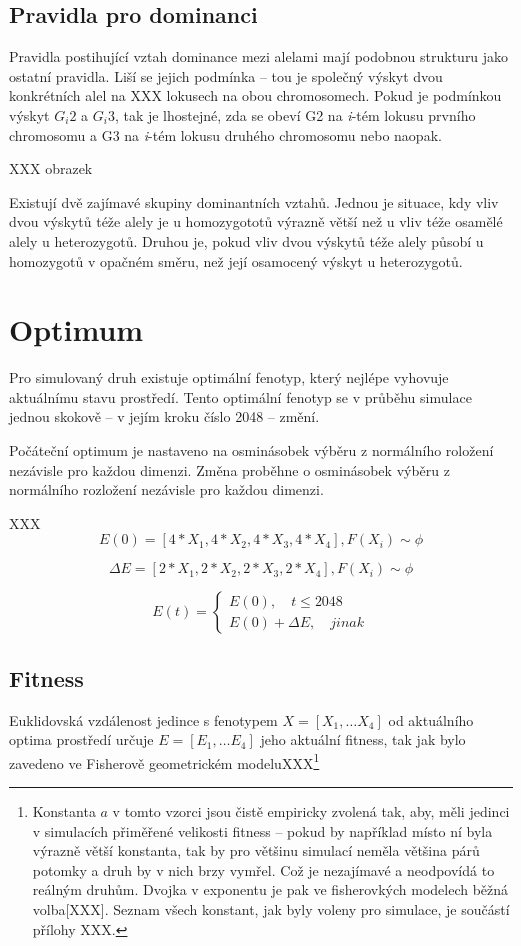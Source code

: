 \subsection{Pravidla pro dominanci}

Pravidla postihující vztah dominance mezi alelami mají podobnou strukturu jako ostatní pravidla. Liší se jejich podmínka -- tou je společný výskyt dvou konkrétních alel na XXX lokusech na obou chromosomech. Pokud je podmínkou výskyt $G_i{2}$ a $G_i{3}$, tak je lhostejné, zda se obeví G2 na \textit{i}-tém lokusu prvního chromosomu a G3 na \textit{i}-tém lokusu druhého chromosomu nebo naopak.

XXX obrazek

Existují dvě zajímavé skupiny dominantních vztahů. Jednou je situace, kdy vliv dvou výskytů téže alely je u homozygototů výrazně větší než u vliv téže osamělé alely u heterozygotů. Druhou je, pokud vliv dvou výskytů téže alely působí u homozygotů v opačném směru, než její osamocený výskyt u heterozygotů.



\section{Optimum}

Pro simulovaný druh existuje optimální fenotyp, který nejlépe vyhovuje aktuálnímu stavu prostředí. Tento optimální fenotyp se v průběhu simulace jednou skokově -- v jejím kroku číslo 2048 -- změní.

Počáteční optimum je nastaveno na osminásobek výběru z normálního roložení nezávisle pro každou dimenzi. Změna proběhne o osminásobek výběru z normálního rozložení nezávisle pro každou dimenzi.

XXX
$$
E(0) =  [4 * X_1, 4 * X_2, 4 * X_3, 4 * X_4], F(X_i) \sim \phi
$$

$$
\Delta{E} = [2 * X_1, 2 * X_2, 2 * X_3, 2 * X_4], F(X_i) \sim \phi
$$

$$
E(t) = \left \{
     \begin{array}{l} E(0), \quad t \leq 2048 \\
                      E(0) + \Delta{E}, \quad jinak
\end{array} \right .
$$

\subsection{Fitness}

Euklidovská vzdálenost jedince s fenotypem $X = [X_1,\dots{}X_4]$ od aktuálního optima prostředí určuje $E = [E_1,\dots{} E_4]$ jeho aktuální fitness, tak jak bylo zavedeno ve Fisherově geometrickém modeluXXX\footnote{Konstanta $a$ v tomto vzorci jsou čistě empiricky zvolená tak, aby, měli jedinci v simulacích přiměřené velikosti fitness -- pokud by například místo ní byla výrazně větší konstanta, tak by pro většinu simulací neměla většina párů potomky a druh by v nich brzy vymřel. Což je nezajímavé a neodpovídá to reálným druhům. Dvojka v exponentu je pak ve fisherovkých modelech běžná volba[XXX].  Seznam všech konstant, jak byly voleny pro simulace, je součástí přílohy XXX.}

